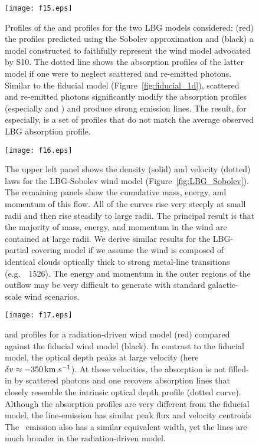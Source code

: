 \documentclass[12pt,preprint]{aastex}
\begin{document}
\clearpage

\begin{figure}
\texttt{[image: f15.eps]}
\caption{
Profiles of the  and  profiles for the two
LBG models considered: (red) the profiles predicted using the 
Sobolev approximation 
and (black) a model constructed to faithfully
represent the wind model advocated by S10.  The dotted line
shows the absorption profiles of the latter model if one were
to neglect scattered and re-emitted photons.  Similar to the fiducial
model (Figure~\ref{fig:fiducial_1d}), scattered and re-emitted photons
significantly modify the absorption profiles (especially 
and \feiib)
and produce strong emission lines.  
The result, for  especially, is a set of profiles that do
not match the average observed LBG absorption profile.
}
\label{fig:LBG_spec}
\end{figure}

\begin{figure}
\texttt{[image: f16.eps]}
\caption{
The upper left panel shows the density (solid) and velocity (dotted)
laws for the LBG-Sobolev wind model (Figure~\ref{fig:LBG_Sobolev}).
The remaining panels show the cumulative mass, energy, and momentum of
this flow.  All of the curves rise very steeply at small radii and
then rise steadily to large radii.  The principal result is that the
majority of mass, energy, and momentum in the wind are contained at
large radii.  We derive similar results for the LBG-partial covering model
if we assume the wind is composed of identical clouds optically thick
to strong metal-line transitions (e.g.\ ~1526).  The
energy and momentum in the outer regions of the outflow may be very
difficult to generate with standard galactic-scale wind scenarios.
}
\label{fig:LBG_cumul}
\end{figure}



\begin{figure}
\texttt{[image: f17.eps]}
\caption{
 and 
profiles for a radiation-driven wind model (red) compared against the
fiducial wind model (black).  In contrast to the fiducial model, the
optical depth peaks at large velocity (here $\delta v
\approx -350 \, {\rm km~s^{-1}}$).  At these velocities, the absorption is not
filled-in by scattered photons and one recovers absorption lines
that closely resemble the intrinsic optical depth profile (dotted
curve).  Although the  absorption profiles are very
different from the fiducial model, the  line-emission has
similar peak flux and velocity centroids 
The \feiis\ emission also has a similar
equivalent width, yet the lines are much broader in the
radiation-driven model. 
}
\label{fig:rad_spec}
\end{figure}
\end{document}
